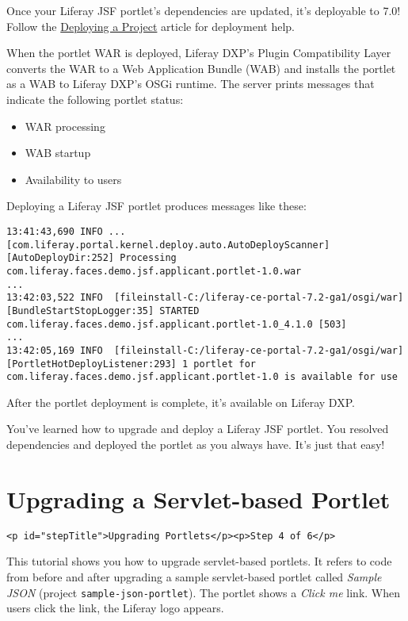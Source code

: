 Once your Liferay JSF portlet's dependencies are updated, it's
deployable to 7.0! Follow the
\href{/docs/7-2/reference/-/knowledge_base/r/deploying-a-project}{Deploying
a Project} article for deployment help.

When the portlet WAR is deployed, Liferay DXP's Plugin Compatibility
Layer converts the WAR to a Web Application Bundle (WAB) and installs
the portlet as a WAB to Liferay DXP's OSGi runtime. The server prints
messages that indicate the following portlet status:

\begin{itemize}
\tightlist
\item
  WAR processing
\item
  WAB startup
\item
  Availability to users
\end{itemize}

Deploying a Liferay JSF portlet produces messages like these:

\begin{verbatim}
13:41:43,690 INFO ... [com.liferay.portal.kernel.deploy.auto.AutoDeployScanner][AutoDeployDir:252] Processing com.liferay.faces.demo.jsf.applicant.portlet-1.0.war
...
13:42:03,522 INFO  [fileinstall-C:/liferay-ce-portal-7.2-ga1/osgi/war][BundleStartStopLogger:35] STARTED com.liferay.faces.demo.jsf.applicant.portlet-1.0_4.1.0 [503]
...
13:42:05,169 INFO  [fileinstall-C:/liferay-ce-portal-7.2-ga1/osgi/war][PortletHotDeployListener:293] 1 portlet for com.liferay.faces.demo.jsf.applicant.portlet-1.0 is available for use
\end{verbatim}

After the portlet deployment is complete, it's available on Liferay DXP.

You've learned how to upgrade and deploy a Liferay JSF portlet. You
resolved dependencies and deployed the portlet as you always have. It's
just that easy!

\chapter{Upgrading a Servlet-based
Portlet}\label{upgrading-a-servlet-based-portlet}

\begin{verbatim}
<p id="stepTitle">Upgrading Portlets</p><p>Step 4 of 6</p>
\end{verbatim}

This tutorial shows you how to upgrade servlet-based portlets. It refers
to code from before and after upgrading a sample servlet-based portlet
called \emph{Sample JSON} (project \texttt{sample-json-portlet}). The
portlet shows a \emph{Click me} link. When users click the link, the
Liferay logo appears.


